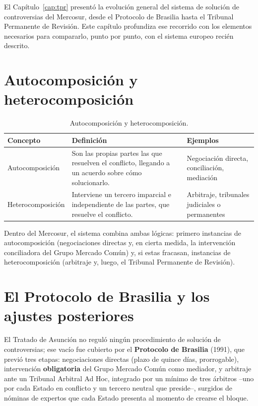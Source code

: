 \documentclass[12pt,oneside]{book}
\begin{document}
El Capítulo~\ref{cap:tpr} presentó la evolución general del sistema de solución de controversias del Mercosur, desde el Protocolo de Brasilia hasta el Tribunal Permanente de Revisión. Este capítulo profundiza ese recorrido con los elementos necesarios para compararlo, punto por punto, con el sistema europeo recién descrito.

\section{Autocomposición y heterocomposición}

\begin{table}[H]
\centering
\renewcommand{\arraystretch}{1.3}
\begin{tabularx}{\textwidth}{>{\raggedright\arraybackslash}p{}>{\raggedright\arraybackslash}X>{\raggedright\arraybackslash}X}
\toprule
\textbf{Concepto} & \textbf{Definición} & \textbf{Ejemplos} \\
\midrule
Autocomposición & Son las propias partes las que resuelven el conflicto, llegando a un acuerdo sobre cómo solucionarlo. & Negociación directa, conciliación, mediación \\
Heterocomposición & Interviene un tercero imparcial e independiente de las partes, que resuelve el conflicto. & Arbitraje, tribunales judiciales o permanentes \\
\bottomrule
\end{tabularx}
\caption{Autocomposición y heterocomposición.}
\end{table}

Dentro del Mercosur, el sistema combina ambas lógicas: primero instancias de autocomposición (negociaciones directas y, en cierta medida, la intervención conciliadora del Grupo Mercado Común) y, si estas fracasan, instancias de heterocomposición (arbitraje y, luego, el Tribunal Permanente de Revisión).

\section{El Protocolo de Brasilia y los ajustes posteriores}

El Tratado de Asunción no reguló ningún procedimiento de solución de controversias; ese vacío fue cubierto por el \textbf{Protocolo de Brasilia} (1991), que previó tres etapas: negociaciones directas (plazo de quince días, prorrogable), intervención \textbf{obligatoria} del Grupo Mercado Común como mediador, y arbitraje ante un Tribunal Arbitral Ad Hoc, integrado por un mínimo de tres árbitros --uno por cada Estado en conflicto y un tercero neutral que preside--, surgidos de nóminas de expertos que cada Estado presenta al momento de crearse el bloque.
\end{document}
